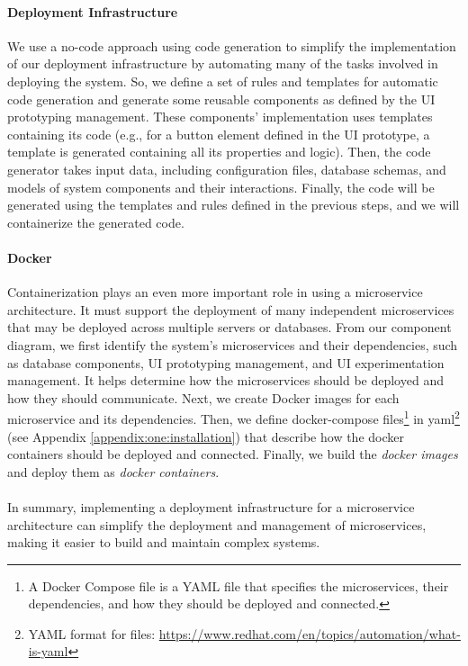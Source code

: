 \paragraph{Deployment Infrastructure}
We use a no-code approach using code generation to simplify the implementation of our deployment infrastructure by automating many of the tasks involved in deploying the system.
So, we define a set of rules and templates for automatic code generation and generate some reusable components as defined by the UI prototyping management. 
These components' implementation uses templates containing its code (e.g., for a button element defined in the UI prototype, a template is generated containing all its properties and logic).
Then, the code generator takes input data, including configuration files, database schemas, and models of system components and their interactions. 
Finally, the code will be generated using the templates and rules defined in the previous steps, and we will containerize the generated code. 

\paragraph{Docker}
Containerization plays an even more important role in using a microservice architecture. 
It must support the deployment of many independent microservices that may be deployed across multiple servers or databases.
From our component diagram, we first identify the system's microservices and their dependencies, such as database components, UI prototyping management, and UI experimentation management. 
It helps determine how the microservices should be deployed and how they should communicate.
Next, we create Docker images for each microservice and its dependencies.
Then, we define docker-compose files\footnote{A Docker Compose file is a YAML file that specifies the microservices, their dependencies, and how they should be deployed and connected.} in yaml\footnote{YAML format for files: \url{https://www.redhat.com/en/topics/automation/what-is-yaml}} (see Appendix \ref{appendix:one:installation}) that describe how the docker containers should be deployed and connected.
Finally, we build the \textit{docker images} and deploy them as \textit{docker containers}. \\\\
In summary, implementing a deployment infrastructure for a microservice architecture can simplify the deployment and management of microservices, making it easier to build and maintain complex systems.

